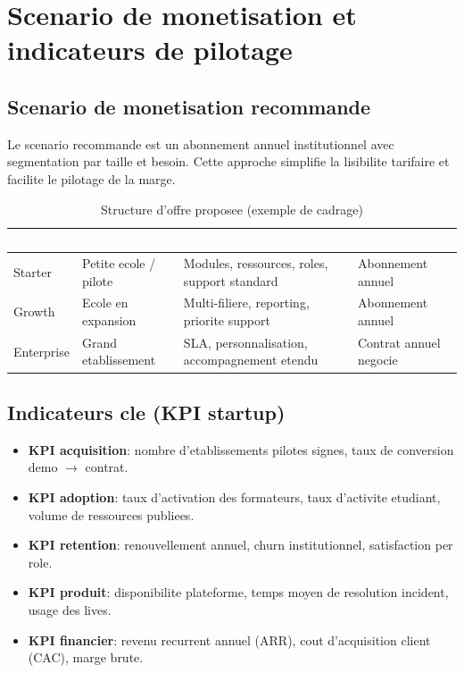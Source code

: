 ﻿\documentclass[12pt,a4paper,oneside]{report}
\begin{document}
\section{Scenario de monetisation et indicateurs de pilotage}

\subsection{Scenario de monetisation recommande}

Le scenario recommande est un abonnement annuel institutionnel avec segmentation par taille et besoin. Cette approche simplifie la lisibilite tarifaire et facilite le pilotage de la marge.

\begin{table}[H]
\centering
\caption{Structure d'offre proposee (exemple de cadrage)}
\label{tab:offre_pricing}
\begin{tabular}{|p{3.2cm}|p{3.4cm}|p{4.0cm}|p{2.0cm}|}
\hline
\rowcolor{ustoblue}
\textcolor{white}{Formule} & \textcolor{white}{Cible} & \textcolor{white}{Valeur livree} & \textcolor{white}{Mode de prix} \\
\hline
Starter & Petite ecole / pilote & Modules, ressources, roles, support standard & Abonnement annuel \\
\hline
Growth & Ecole en expansion & Multi-filiere, reporting, priorite support & Abonnement annuel \\
\hline
Enterprise & Grand etablissement & SLA, personnalisation, accompagnement etendu & Contrat annuel negocie \\
\hline
\end{tabular}
\end{table}

\subsection{Indicateurs cle (KPI startup)}

\begin{itemize}
  \item \textbf{KPI acquisition}: nombre d'etablissements pilotes signes, taux de conversion demo $\rightarrow$ contrat.
  \item \textbf{KPI adoption}: taux d'activation des formateurs, taux d'activite etudiant, volume de ressources publiees.
  \item \textbf{KPI retention}: renouvellement annuel, churn institutionnel, satisfaction per role.
  \item \textbf{KPI produit}: disponibilite plateforme, temps moyen de resolution incident, usage des lives.
  \item \textbf{KPI financier}: revenu recurrent annuel (ARR), cout d'acquisition client (CAC), marge brute.
\end{itemize}
\end{document}

